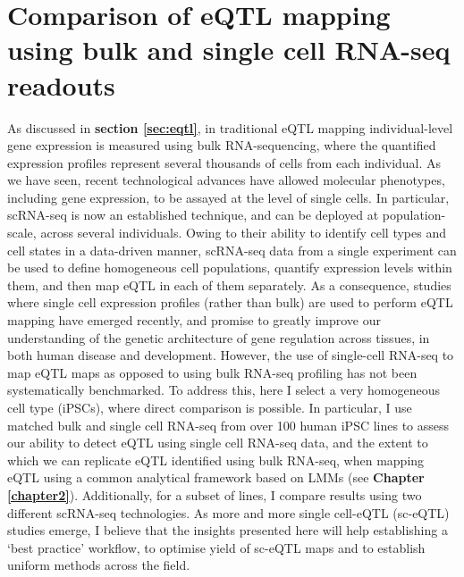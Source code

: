 
\chapter{Comparison of eQTL mapping using bulk and single cell RNA-seq readouts}
\label{chapter3}

As discussed in \textbf{section \ref{sec:eqtl}}, in traditional eQTL mapping individual-level gene expression is
measured using bulk RNA-sequencing, where the quantified expression profiles represent several thousands of cells from each individual.
As we have seen, recent technological advances have allowed molecular phenotypes, including gene expression, to be assayed at the level of single cells.
In particular, scRNA-seq is now an established technique, and can be deployed at population-scale, across several individuals.
Owing to their ability to identify cell types and cell states in a data-driven manner, scRNA-seq data from a single experiment can be used to define homogeneous cell populations, quantify expression levels within them, and then map eQTL in each of them separately.
As a consequence, studies where single cell expression profiles (rather than bulk) are used to perform eQTL mapping have emerged recently, and promise to greatly improve our understanding of the genetic architecture of 
gene regulation across tissues, in both human disease and development.
However, the use of single-cell RNA-seq to map eQTL maps as opposed to using bulk RNA-seq profiling has not been systematically benchmarked.
To address this, here I select a very homogeneous cell type (iPSCs), where direct comparison is possible.
In particular, I use matched bulk and single cell RNA-seq from over 100 human iPSC lines to assess our ability to detect eQTL using single cell RNA-seq data, and the extent to which we can replicate eQTL identified using bulk RNA-seq, when mapping eQTL using a common analytical framework based on LMMs (see \textbf{Chapter \ref{chapter2}}).
Additionally, for a subset of lines, I compare results using two different scRNA-seq technologies.
As more and more single cell-eQTL (sc-eQTL) studies emerge, I believe that
the insights presented here will help establishing a `best practice' workflow, to optimise yield of sc-eQTL maps and to establish uniform methods across the field.

